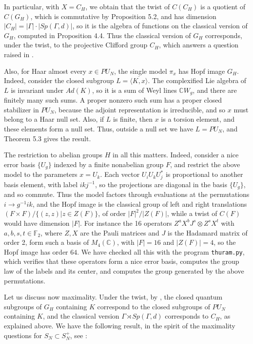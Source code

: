 \documentclass[11pt]{amsart}
\theoremstyle{definition}
\begin{document}
In particular, with $X=C_H$, we obtain that the twist of $C(C_H)$ is a quotient of $C(G_H)$, which is commutative by Proposition 5.2, and has dimension $|C_H|=|\Gamma|\cdot|Sp(\Gamma,d)|$, so it is the algebra of functions on the classical version of $G_H$, computed in Proposition 4.4. Thus the classical version of $G_H$ corresponds, under the twist, to the projective Clifford group $C_H$, which answers a question raised in \cite[section 4]{cte}.

Also, for Haar almost every $x\in PU_N$, the single model $\pi_x$ has Hopf image $G_H$. Indeed, consider the closed subgroup $L=\overline{\langle K,x\rangle}$. The complexified Lie algebra of $L$ is invariant under $Ad(K)$, so it is a sum of Weyl lines $\mathbb CW_g$, and there are finitely many such sums. A proper nonzero such sum has a proper closed stabilizer in $PU_N$, because the adjoint representation is irreducible, and so $x$ must belong to a Haar null set. Also, if $L$ is finite, then $x$ is a torsion element, and these elements form a null set. Thus, outside a null set we have $L=PU_N$, and Theorem 5.3 gives the result.

The restriction to abelian groups $H$ in all this matters. Indeed, consider a nice error basis $\{U_g\}$ indexed by a finite nonabelian group $F$, and restrict the above model to the parameters $x=U_k$. Each vector $U_iU_kU_j^*$ is proportional to another basis element, with label $ikj^{-1}$, so the projections are diagonal in the basis $\{U_g\}$, and so commute. Thus the model factors through evaluations at the permutations $i\to g^{-1}ik$, and the Hopf image is the classical group of left and right translations $(F\times F)/\{(z,z)|z\in Z(F)\}$, of order $|F|^2/|Z(F)|$, while a twist of $C(F)$ would have dimension $|F|$. For instance the 16 operators $Z^aX^bJ^s\otimes Z^sX^t$ with $a,b,s,t\in\mathbb F_2$, where $Z,X$ are the Pauli matrices and $J$ is the Hadamard matrix of order 2, form such a basis of $M_4(\mathbb C)$, with $|F|=16$ and $|Z(F)|=4$, so the Hopf image has order $64$. We have checked all this with the program {\tt thuram.py}, which verifies that these operators form a nice error basis, computes the group law of the labels and its center, and computes the group generated by the above permutations.

Let us discuss now maximality. Under the twist, by \cite[Lemma 4.13]{cte}, the closed quantum subgroups of $G_H$ containing $K$ correspond to the closed subgroups of $PU_N$ containing $K$, and the classical version $\Gamma\rtimes Sp(\Gamma,d)$ corresponds to $C_H$, as explained above. We have the following result, in the spirit of the maximality questions for $S_N\subset S_N^+$, see \cite{cte}:
\end{document}
